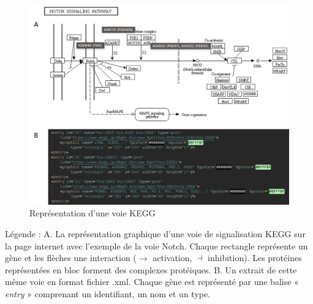 \begin{figure}[H]
    \centering
    \includegraphics[width=1\textwidth]{figures/corps/figure13.png}
    \caption{Représentation d’une voie KEGG}
    \label{fig:13_kegg}
\end{figure}
Légende : A. La représentation graphique d’une voie de signalisation KEGG sur la page internet avec l’exemple de la voie Notch. Chaque rectangle représente un gène et les flèches une interaction ($\rightarrow$ activation, $\dashv$ inhibition). Les protéines représentées en bloc forment des complexes protéiques. B. Un extrait de cette même voie en format fichier .xml. Chaque gène est représenté par une balise « \textit{entry} » comprenant un identifiant, un nom et un type. 

